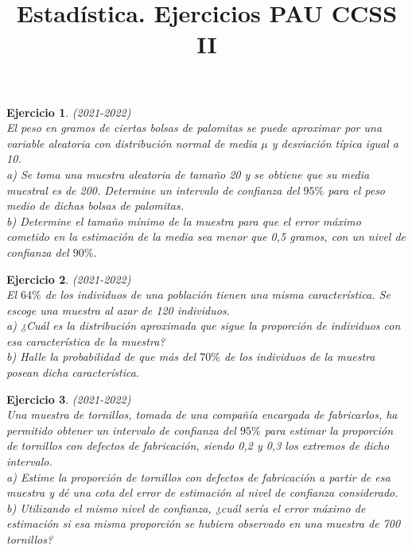 \documentclass[12pt, a4paper]{amsart}
\newtheorem{ejer}{Ejercicio}
\begin{document}
\thispagestyle{plain}

\title{Estadística. Ejercicios PAU CCSS II}

\date{}

\maketitle

\begin{ejer}\em (2021-2022)\\
El peso en gramos de ciertas bolsas de palomitas se puede aproximar por una variable aleatoria con distribución normal de media $\mu$ y desviación típica igual a 10.\\
a) Se toma una muestra aleatoria de tamaño 20 y se obtiene que su media muestral es de 200. Determine un intervalo de confianza del $95\%$ para el peso medio de dichas bolsas de palomitas.\\
b) Determine el tamaño mínimo de la muestra para que el error máximo cometido en la estimación de la media sea menor que 0,5 gramos, con un nivel de confianza del $90\%.$
\end{ejer}

\begin{ejer}\em (2021-2022)\\
El $64\%$ de los individuos de una población tienen una misma característica. Se escoge una muestra al azar de 120 individuos.\\
a) ¿Cuál es la distribución aproximada que sigue la proporción de individuos con esa característica de la muestra?\\
b) Halle la probabilidad de que más del $70\%$ de los individuos de la muestra posean dicha característica.
\end{ejer}

\begin{ejer}\em (2021-2022)\\
Una muestra de tornillos, tomada de una compañía encargada de fabricarlos, ha permitido obtener un intervalo de confianza del $95\%$ para estimar la proporción de tornillos con defectos de fabricación, siendo 0,2 y 0,3 los extremos de dicho intervalo.\\
a) Estime la proporción de tornillos con defectos de fabricación a partir de esa muestra y dé una cota del error de estimación al nivel de confianza considerado.\\
b) Utilizando el mismo nivel de confianza, ¿cuál sería el error máximo de estimación si esa misma proporción se hubiera observado en una muestra de 700 tornillos?
\end{ejer}
\end{document}
